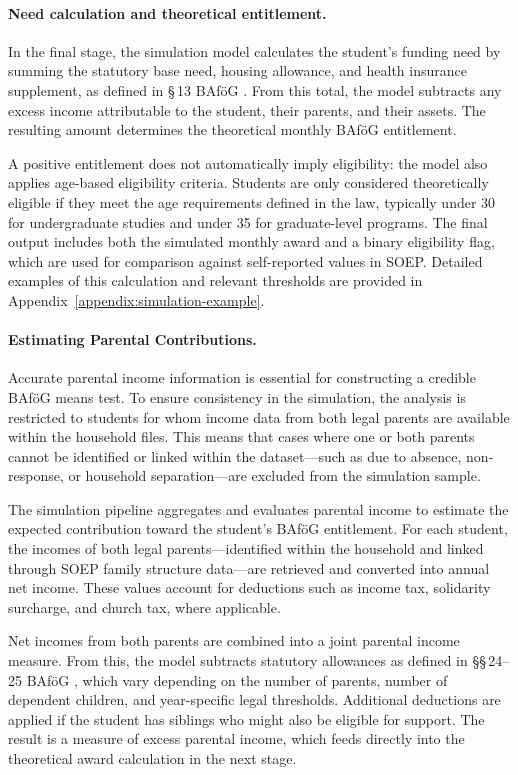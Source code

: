 \paragraph{Need calculation and theoretical entitlement.}
In the final stage, the simulation model calculates the student's funding need by summing the statutory base need, housing allowance, and health insurance supplement, as defined in §\,13 BAföG \citep{bafoeg_law}. 
From this total, the model subtracts any excess income attributable to the student, their parents, and their assets. 
The resulting amount determines the theoretical monthly BAföG entitlement.

A positive entitlement does not automatically imply eligibility: the model also applies age-based eligibility criteria. 
Students are only considered theoretically eligible if they meet the age requirements defined in the law, typically under 30 for undergraduate studies and under 35 for graduate-level programs. 
The final output includes both the simulated monthly award and a binary eligibility flag, which are used for comparison against self-reported values in SOEP. 
Detailed examples of this calculation and relevant thresholds are provided in Appendix~\ref{appendix:simulation-example}.


\paragraph{Estimating Parental Contributions.}
Accurate parental income information is essential for constructing a credible BAföG means test. 
To ensure consistency in the simulation, the analysis is restricted to students for whom income data from both legal parents are available within the household files. 
This means that cases where one or both parents cannot be identified or linked within the dataset—such as due to absence, non-response, or household separation—are excluded from the simulation sample.

The simulation pipeline aggregates and evaluates parental income to estimate the expected contribution toward the student’s BAföG entitlement. 
For each student, the incomes of both legal parents—identified within the household and linked through SOEP family structure data—are retrieved and converted into annual net income. 
These values account for deductions such as income tax, solidarity surcharge, and church tax, where applicable.

Net incomes from both parents are combined into a joint parental income measure. 
From this, the model subtracts statutory allowances as defined in §§\,24–25 BAföG \citep{bafoeg_law}, which vary depending on the number of parents, number of dependent children, and year-specific legal thresholds. 
Additional deductions are applied if the student has siblings who might also be eligible for support. 
The result is a measure of excess parental income, which feeds directly into the theoretical award calculation in the next stage.

